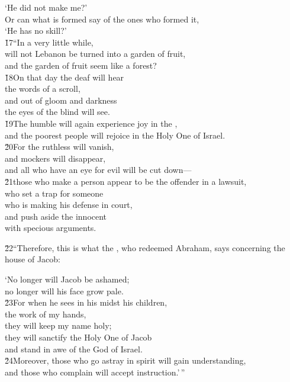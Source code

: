 \begin{poetry}
\poemll    `He did not make me?' \\
\poeml Or can what is formed say of the ones who formed it, \\
\poemll    `He has no skill?' \\
\poeml \v{17}``In a very little while, \\
\poemll    will not Lebanon be turned into a garden of fruit, \\
\poemlll       and the garden of fruit seem like a forest? \\
\poeml \v{18}On that day the deaf will hear \\
\poemll    the words of a scroll, \\
\poeml and out of gloom and darkness \\
\poemll    the eyes of the blind will see. \\
\poeml \v{19}The humble will again experience joy in the , \\
\poemll    and the poorest people will rejoice in the Holy One of Israel. \\
\poeml \v{20}For the ruthless will vanish, \\
\poemll    and mockers will disappear, \\
\poemlll       and all who have an eye for evil will be cut down--- \\
\poeml \v{21}those who make a person appear to be the offender in a lawsuit, \\
\poemll    who set a trap for someone \\
\poemlll       who is making his defense in court, \\
\poeml and push aside the innocent \\
\poemll    with specious arguments.
\end{poetry}

\v{22}``Therefore, this is what the , who redeemed Abraham, says concerning the house of Jacob:

\begin{poetry}
\poeml `No longer will Jacob be ashamed; \\
\poemll    no longer will his face grow pale. \\
\poeml \v{23}For when he sees in his midst his children, \\
\poemll    the work of my hands, \\
\poeml they will keep my name holy; \\
\poemll    they will sanctify the Holy One of Jacob \\
\poemlll       and stand in awe of the God of Israel. \\
\poeml \v{24}Moreover, those who go astray in spirit will gain understanding, \\
\poemll    and those who complain will accept instruction.'\,''
\end{poetry}

